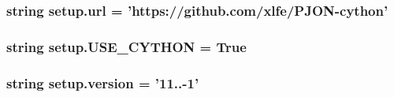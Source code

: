 \hypertarget{namespacesetup_a3376e8b9735800b5b9e455914cee908d}{
\subsubsection[{url}]{\setlength{\rightskip}{0pt plus 5cm}string setup.\-url = 'https\-://github.\-com/xlfe/P\-J\-O\-N-\/cython'}}\label{namespacesetup_a3376e8b9735800b5b9e455914cee908d}
\hypertarget{namespacesetup_aa07dc63c1159effcf0fa37c51661f588}{
\subsubsection[{U\-S\-E\-\_\-\-C\-Y\-T\-H\-O\-N}]{\setlength{\rightskip}{0pt plus 5cm}string setup.\-U\-S\-E\-\_\-\-C\-Y\-T\-H\-O\-N = True}}\label{namespacesetup_aa07dc63c1159effcf0fa37c51661f588}
\hypertarget{namespacesetup_ab177531e7a80674a3db3de2d79eb8be7}{
\subsubsection[{version}]{\setlength{\rightskip}{0pt plus 5cm}string setup.\-version = '11..-\/1'}}\label{namespacesetup_ab177531e7a80674a3db3de2d79eb8be7}
